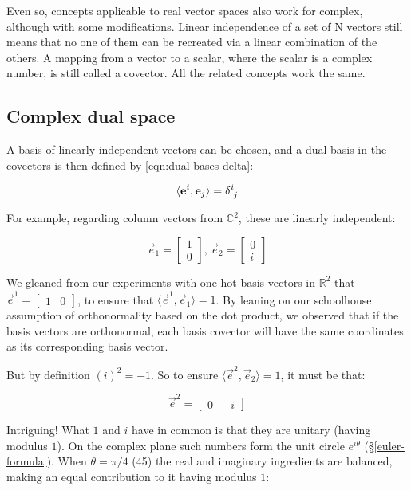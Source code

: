 Even so, concepts applicable to real vector spaces also work for complex, although with some modifications. Linear independence of a set of N vectors still means that no one of them can be recreated via a linear combination of the others. A mapping from a vector to a scalar, where the scalar is a complex number, is still called a covector. All the related concepts work the same.

\subsection{Complex dual space}

A basis of linearly independent vectors can be chosen, and a dual basis in the covectors is then defined by \eqref{eqn:dual-bases-delta}:

$$
\langle \vec{e}^i,\vec{e}_j\rangle = \delta\indices{^i_j}
$$  

For example, regarding column vectors from $\mathbb{C}^2$, these are linearly independent:

$$
\vec{e}_1 = \begin{bmatrix}1 \\ 0\end{bmatrix}
, \,
\vec{e}_2 = \begin{bmatrix}0 \\ i\end{bmatrix}
$$

We gleaned from our experiments with one-hot basis vectors in $\mathbb{R}^2$ that $\vec{e}^1 = \begin{bmatrix}1 & 0\end{bmatrix}$, to ensure that $\langle \vec{e}^1,\vec{e}_1\rangle = 1$. By leaning on our schoolhouse assumption of orthonormality based on the dot product, we observed that if the basis vectors are orthonormal, each basis covector will have the same coordinates as its corresponding basis vector.

But by definition $(i)^2 = -1$. So to ensure $\langle \vec{e}^2,\vec{e}_2\rangle = 1$, it must be that:

$$
\vec{e}^2 = \begin{bmatrix}0 & -i\end{bmatrix}
$$

Intriguing! What $1$ and $i$ have in common is that they are unitary (having modulus $1$). On the complex plane such numbers form the unit circle $e^{i\theta}$ (§\ref{euler-formula}). When $\theta = \pi / 4$ (45\textdegree) the real and imaginary ingredients are balanced, making an equal contribution to it having modulus $1$:

